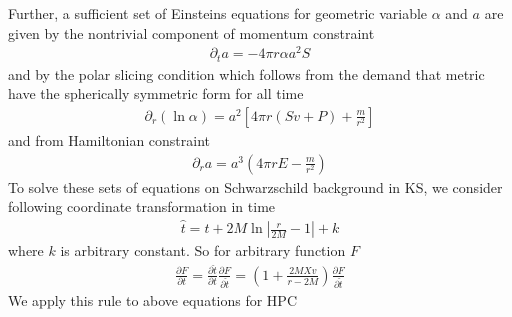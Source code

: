 \documentclass[prd]{revtex4}
\newcommand*\apost{\textsc{\char13}}
\begin{document}
Further, a sufficient set of Einstein\apost s equations for geometric variable $\alpha$ and $a$ are given by the nontrivial component of momentum constraint
\begin{align}
\partial_t a = - 4 \pi r \alpha a^2 S
\end{align}
and by the polar slicing condition which follows from the demand that metric have the spherically symmetric form for all time
\begin{align}
\partial_r (\ln \alpha) = a^2 \left[4 \pi r (Sv+P) + \frac{m}{r^2} \right]
\end{align}
and from Hamiltonian constraint
\begin{align}
\partial_r a = a^3 \left(4 \pi r E - \frac{m}{r^2} \right)
\end{align}
To solve these sets of equations on Schwarzschild background in KS, we consider following coordinate transformation in time 
\begin{align}
\hat{t} = t + 2 M \ln | \frac{r}{2M} - 1 | + k
\end{align}
where $k$ is arbitrary constant. So for arbitrary function $F$
\begin{align}
\frac{\partial F}{\partial t} = \frac{\partial \hat{t}}{\partial t} \frac{\partial F}{\partial \hat{t}} = \left(1+\frac{2MXv}{r-2M} \right) \frac{\partial F}{\partial \hat{t}}
\end{align}
We apply this rule to above equations for HPC


\end{document}
